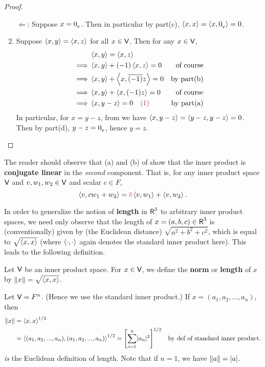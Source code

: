 \begin{proof}
\begin{enumerate}
\(\Longleftarrow\): Suppose \(x = 0_{_{\textsf{V}}}\).
Then in particular by part(c), \(\left< x, x \right> = \left< x, 0_{_{\textsf{V}}} \right> = 0\).

\item Suppose \(\left< x, y \right> = \left< x, z \right>\) for all \(x \in \textsf{V}\).
Then for any \(x \in \textsf{V}\),
\begin{align*}
             & \LG x, y \RG = \LG x, z \RG \\
    \implies & \LG x, y \RG + (-1) \LG x, z \RG = 0 & \text{of course} \\
    \implies & \LG x, y \RG + \LG x, \conjugatet{(-1)} z \RG = 0 & \text{by part(b)} \\
    \implies & \LG x, y \RG + \LG x, (-1) z \RG = 0 & \text{of course} \\
    \implies & \LG x, y - z \RG = 0 \quad \MAROON{(1)} & \text{by part(a)} \\
\end{align*}
In particular, for \(x = y - z\), from  we have \(\left< x, y - z \right> = \left< y - z, y - z \right> = 0\).
Then by part(d), \(y - z = 0_{_{\textsf{V}}}\), hence \(y = z\).
\end{enumerate}
\end{proof}

\begin{remark} \label{remark 6.1.9}
The reader should observe that (a) and (b) of  show that the inner product is \textbf{conjugate linear} in the \emph{second} component.
That is, for any inner product space \(\textsf{V}\) and \(v, w_1, w_2 \in \textsf{V}\) and scalar \(c \in F\),
\[
    \LG v, c w_1 + w_2 \RG = \RED{\conjugatet{c}} \LG v, w_1 \RG + \LG v, w_2 \RG.
\]
\end{remark}

In order to generalize the notion of \textbf{length} in \(\textsf{R}^3\) to arbitrary inner product spaces, we need only observe that the length of \(x = (a, b, c) \in \textsf{R}^3\) is (conventionally) given by (the Euclidean distance) \( \sqrt{a^2 + b^2 + c^2} \), which is equal to \(\sqrt{\left< x, x\right>}\) (where \(\left< \cdot, \cdot \right>\) again denotes the standard inner product here).
This leads to the following definition.

\begin{definition} \label{def 6.3}
Let \(\textsf{V}\) be an inner product space.
For \(x \in \textsf{V}\), we define the \textbf{norm} or \textbf{length} of \(x\) by \(\left\lVert x\right\rVert = \sqrt{\left< x, x \right>}\).
\end{definition}

\begin{example} \label{example 6.1.6}
Let \(\textsf{V} = F^n\).
(Hence we use the standard inner product.)
If \(x = (a_1, a_2, ..., a_n)\), then
\begin{align*}
    \left\lVert x\right\rVert & = \left< x, x \right>^{1/2} \\
        & = \left< (a_1, a_2, ..., a_n), (a_1, a_2, ..., a_n) \right>^{1/2}
        = \left[ \sum_{i = 1}^n \lvert a_n\rvert^2 \right]^{1/2} & \text{by def of standard inner product.}
\end{align*}
\emph{is} the Euclidean definition of length.
Note that if \(n = 1\), we have \(\left\lVert a\right\rVert = \lvert a\rvert\).
\end{example}

